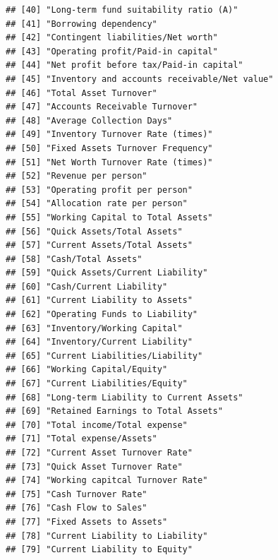 \documentclass[
]{book}
\begin{document}
\begin{verbatim}
## [40] "Long-term fund suitability ratio (A)"                   
## [41] "Borrowing dependency"                                   
## [42] "Contingent liabilities/Net worth"                       
## [43] "Operating profit/Paid-in capital"                       
## [44] "Net profit before tax/Paid-in capital"                  
## [45] "Inventory and accounts receivable/Net value"            
## [46] "Total Asset Turnover"                                   
## [47] "Accounts Receivable Turnover"                           
## [48] "Average Collection Days"                                
## [49] "Inventory Turnover Rate (times)"                        
## [50] "Fixed Assets Turnover Frequency"                        
## [51] "Net Worth Turnover Rate (times)"                        
## [52] "Revenue per person"                                     
## [53] "Operating profit per person"                            
## [54] "Allocation rate per person"                             
## [55] "Working Capital to Total Assets"                        
## [56] "Quick Assets/Total Assets"                              
## [57] "Current Assets/Total Assets"                            
## [58] "Cash/Total Assets"                                      
## [59] "Quick Assets/Current Liability"                         
## [60] "Cash/Current Liability"                                 
## [61] "Current Liability to Assets"                            
## [62] "Operating Funds to Liability"                           
## [63] "Inventory/Working Capital"                              
## [64] "Inventory/Current Liability"                            
## [65] "Current Liabilities/Liability"                          
## [66] "Working Capital/Equity"                                 
## [67] "Current Liabilities/Equity"                             
## [68] "Long-term Liability to Current Assets"                  
## [69] "Retained Earnings to Total Assets"                      
## [70] "Total income/Total expense"                             
## [71] "Total expense/Assets"                                   
## [72] "Current Asset Turnover Rate"                            
## [73] "Quick Asset Turnover Rate"                              
## [74] "Working capitcal Turnover Rate"                         
## [75] "Cash Turnover Rate"                                     
## [76] "Cash Flow to Sales"                                     
## [77] "Fixed Assets to Assets"                                 
## [78] "Current Liability to Liability"                         
## [79] "Current Liability to Equity"                            

\end{verbatim}
\end{document}
